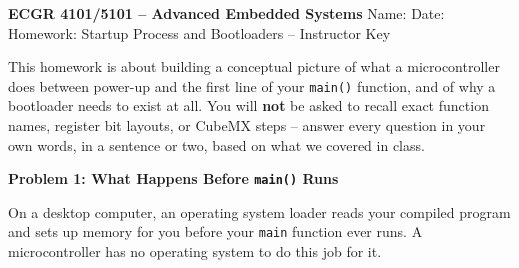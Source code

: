 \documentclass[11pt]{article}
\newcommand{\docsuffix}{ -- Instructor Key}
\newcommand{\docsuffix}{}
\begin{document}
{\Large\bfseries ECGR 4101/5101 -- Advanced Embedded Systems}\hfill
Name: \underline{\hspace{5cm}}\quad Date: \underline{\hspace{2.5cm}}\\[2pt]
{\large Homework: Startup Process and Bootloaders\docsuffix}

\smallskip
This homework is about building a conceptual picture of what a microcontroller
does between power-up and the first line of your \texttt{main()} function, and
of why a bootloader needs to exist at all. You will \textbf{not} be asked to
recall exact function names, register bit layouts, or CubeMX steps --
answer every question in your own words, in a sentence or two, based on
what we covered in class.

\bigskip
\textbf{Problem 1: What Happens Before \texttt{main()} Runs}

\smallskip
On a desktop computer, an operating system loader reads your compiled
program and sets up memory for you before your \texttt{main} function ever
runs. A microcontroller has no operating system to do this job for it.
\end{document}
